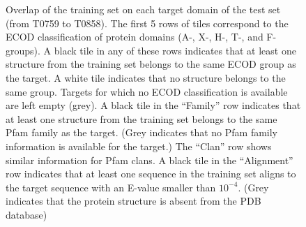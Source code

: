 \begin{figure}[H]
%
    \caption{Overlap of the training set on each target domain of the
    test set (from T0759 to T0858). The first 5 rows of tiles
    correspond to the ECOD classification of protein domains (A-, X-,
    H-, T-, and F-groups). A black tile in any of these rows indicates
    that at least one structure from the training set belongs to the
    same ECOD group as the target. A white tile indicates that no
    structure belongs to the same group. Targets for which no ECOD
    classification is available are left empty (grey).
    A black tile in the ``Family'' row indicates that at least one
    structure from the training set belongs to the same Pfam family as
    the target. (Grey indicates that no Pfam family information is
    available for the target.) The ``Clan'' row shows similar
    information for Pfam clans. A black tile in the ``Alignment'' row
    indicates that at least one sequence in the training set aligns to
    the target sequence with an E-value smaller than $10^{-4}$. (Grey
    indicates that the protein structure is absent from the PDB database)}
    \label{Fig:summaryTable}
\end{figure}
